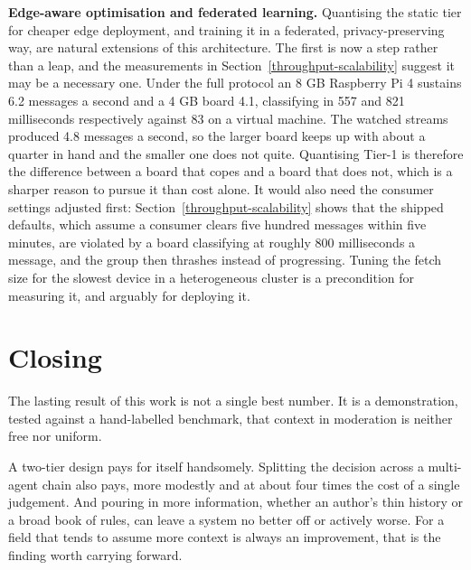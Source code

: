\textbf{Edge-aware optimisation and federated learning.} Quantising the static tier for cheaper edge deployment, and training it in a federated, privacy-preserving way, are natural extensions of this architecture. The first is now a step rather than a leap, and the measurements in Section~\ref{throughput-scalability} suggest it may be a necessary one. Under the full protocol an 8 GB Raspberry Pi 4 sustains 6.2 messages a second and a 4 GB board 4.1, classifying in 557 and 821 milliseconds respectively against 83 on a virtual machine. The watched streams produced 4.8 messages a second, so the larger board keeps up with about a quarter in hand and the smaller one does not quite. Quantising Tier-1 is therefore the difference between a board that copes and a board that does not, which is a sharper reason to pursue it than cost alone. It would also need the consumer settings adjusted first: Section~\ref{throughput-scalability} shows that the shipped defaults, which assume a consumer clears five hundred messages within five minutes, are violated by a board classifying at roughly 800 milliseconds a message, and the group then thrashes instead of progressing. Tuning the fetch size for the slowest device in a heterogeneous cluster is a precondition for measuring it, and arguably for deploying it.

\section{Closing}\label{closing}

The lasting result of this work is not a single best number. It is a demonstration, tested against a hand-labelled benchmark, that context in moderation is neither free nor uniform.

A two-tier design pays for itself handsomely. Splitting the decision across a multi-agent chain also pays, more modestly and at about four times the cost of a single judgement. And pouring in more information, whether an author's thin history or a broad book of rules, can leave a system no better off or actively worse. For a field that tends to assume more context is always an improvement, that is the finding worth carrying forward.
